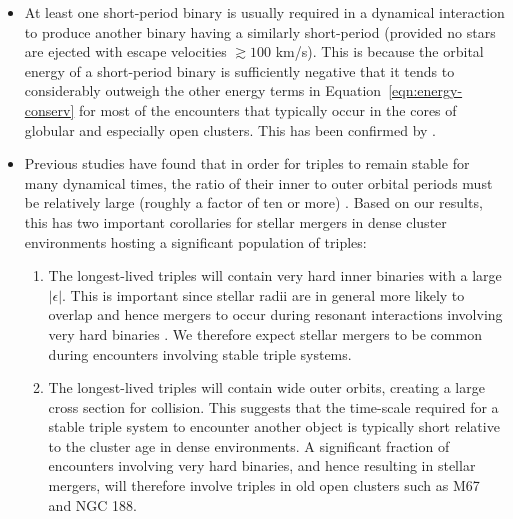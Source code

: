 \begin{itemize}

\item At least one short-period binary is usually required in a
  dynamical interaction to produce another binary having a similarly
  short-period (provided no stars are ejected with escape velocities
  $\gtrsim 100$ km/s).  This is because the orbital energy of a
  short-period binary is sufficiently negative that it tends to
  considerably outweigh the other energy terms in
  Equation~\ref{eqn:energy-conserv} for most of the encounters that
  typically occur in the cores of globular and especially open
  clusters.  This has been confirmed by \citet{hurley05}. 

\item Previous studies have found that in order for triples to remain
  stable for many dynamical times, the ratio of their inner to outer
  orbital periods must be relatively large (roughly a factor of ten or
  more) \citep[e.g.][]{mardling01}.  Based on our results, this has
  two important corollaries for stellar mergers in dense cluster
  environments hosting a significant population of triples:

\begin{enumerate}

\item  The longest-lived triples will contain very hard inner binaries
with a large $|\epsilon|$.  This is important since stellar radii are 
in general more likely to overlap and hence mergers to occur
during resonant interactions involving very hard binaries
\citep[e.g.][]{fregeau04, hurley05}.  We therefore expect stellar mergers
to be common during encounters involving stable triple systems.

\item  The longest-lived triples will contain wide outer orbits, creating
a large cross section for collision.  This suggests that the 
time-scale required for a stable triple system to encounter another
object is typically short relative to the cluster age in dense
environments.  A significant fraction of encounters
involving very hard binaries, and hence resulting in stellar mergers,
will therefore involve triples in old open clusters such as M67
and NGC 188. 

\end{enumerate}

\end{itemize}

